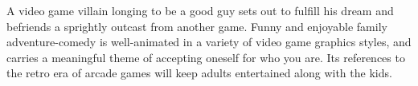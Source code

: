    A video game villain longing to be a good guy sets out to fulfill his dream and befriends a sprightly outcast from another game. Funny and enjoyable family adventure-comedy is well-animated in a variety of video game graphics styles, and carries a meaningful theme of accepting oneself for who you are. Its references to the retro era of arcade games will keep adults entertained along with the kids. \author{DW} 
